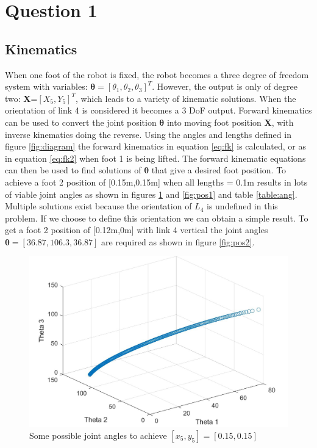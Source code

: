 \documentclass[twoside,twocolumn]{article}
\begin{document}
\section{Question 1}
\subsection{Kinematics}
When one foot of the robot is fixed, the robot becomes a three degree of freedom system with variables: $\boldsymbol{\theta}=[\theta_1,\theta_2, \theta_3]^T$. However, the output is only of degree two: \textbf{X}=$[X_5,Y_5]^T$, which leads to a variety of kinematic solutions. When the orientation of link 4 is considered it becomes a 3 DoF output. Forward kinematics can be used to convert the joint position $\boldsymbol{\theta}$ into moving foot position \textbf{X}, with inverse kinematics doing the reverse. Using the angles and lengths defined in figure \ref{fig:diagram} the forward kinematics in equation \ref{eq:fk} is calculated, or as in equation \ref{eq:fk2} when foot 1 is being lifted. The forward kinematic equations can then be used to find solutions of $\boldsymbol{\theta}$ that give a desired foot position.
\newline
To achieve a foot 2 position of [0.15m,0.15m] when all lengths = 0.1m results in lots of viable joint angles as shown in figures \ref{fig:angles} and \ref{fig:pos1} and table \ref{table:ang}. Multiple solutions exist because the orientation of $L_4$ is undefined in this problem. If we choose to define this orientation we can obtain a simple result. To get a foot 2 position of [0.12m,0m] with link 4 vertical the joint angles $\boldsymbol{\theta} = [36.87,106.3,36.87]$ are required as shown in figure \ref{fig:pos2}.

\begin{figure}[h]
  \centering
    \includegraphics[width=\linewidth]{1_1}
  \caption{Some possible joint angles to achieve $[x_5,y_5]=[0.15,0.15]$}
  \label{fig:angles}
\end{figure}
\end{document}
